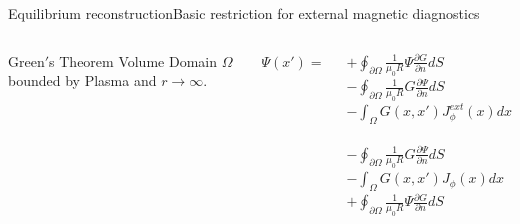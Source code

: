 \documentclass{beamer}
\begin{document}
 \begin{frame}{Equilibrium reconstruction}{Basic restriction for  external  magnetic diagnostics }
 \begin{columns}
	\begin{block}{Green$'$s Theorem }
		Volume Domain $\Omega$ bounded by Plasma and $r \to \infty$.
	\end{block}


$\Psi (x') = $

	  { 
			$ + \oint_{\partial \Omega} \frac{1}{\mu_0 R} \Psi  \frac{\partial G }{\partial n}  dS$ \\
			$  - \oint_{\partial \Omega} \frac{1}{\mu_0 R} G \frac{\partial \Psi }{\partial n} dS $
			}
	\only<2>  {   $ - \int_\Omega G(x,x') J_\phi^{ext}(x) d x$\\
 \\
			$  - \oint_{\partial \Omega} \frac{1}{\mu_0 R} G \frac{\partial \Psi }{\partial n} dS $}
	\only<3>  {   $ - \int_\Omega G(x,x') J_\phi (x) d x$\\
  			$ + \oint_{\partial \Omega} \frac{1}{\mu_0 R} \Psi  \frac{\partial G }{\partial n}  dS$ \\
			}


\end{columns}
\end{frame}
\end{document}
